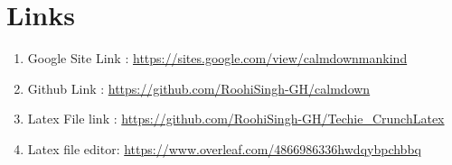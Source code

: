 \section{Links}
\begin{enumerate}
    \item Google Site Link :
\url{https://sites.google.com/view/calmdownmankind}
\item Github Link : 
\url{https://github.com/RoohiSingh-GH/calmdown}
\item Latex File link : \url{https://github.com/RoohiSingh-GH/Techie_CrunchLatex}
 \item Latex file editor:  
 \url{https://www.overleaf.com/4866986336hwdqybpchbbq}
\end{enumerate}
